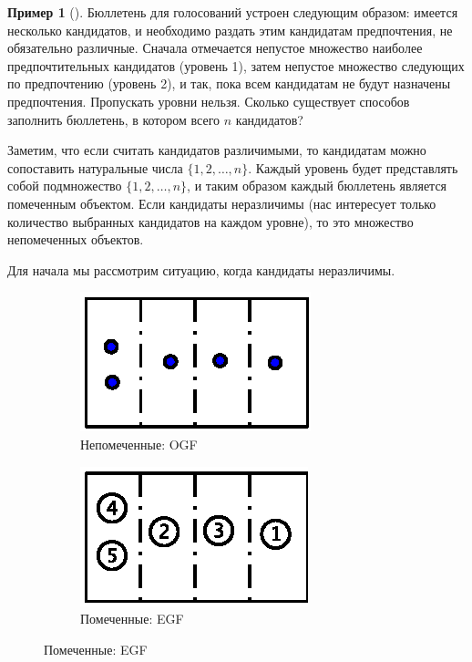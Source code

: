 \documentclass[a5paper]{article}
\theoremstyle{definition}
\newtheorem{example}{Пример}
\begin{document}
\begin{example}[{\cite[Example 10, p.36]{species}}]
Бюллетень для голосований устроен следующим образом: имеется несколько 
кандидатов, и необходимо раздать этим кандидатам предпочтения, не обязательно 
различные. Сначала отмечается 
непустое множество наиболее предпочтительных кандидатов (уровень 1), затем 
непустое множество следующих по предпочтению (уровень 2), и так, 
пока всем кандидатам не будут назначены предпочтения. Пропускать уровни нельзя. 
Сколько 
существует способов заполнить бюллетень, в котором всего \( n \) кандидатов? 

Заметим, что если считать кандидатов различимыми, то кандидатам можно 
сопоставить натуральные числа \( \{1, 2, \ldots, n\} \). Каждый уровень будет 
представлять собой подмножество \( \{1,2,\ldots, n\} \), и таким образом 
каждый бюллетень является помеченным объектом. Если кандидаты 
неразличимы (нас интересует только количество выбранных кандидатов на каждом 
уровне), то это множество непомеченных объектов.

Для начала мы рассмотрим ситуацию, когда кандидаты неразличимы. 

	\begin{figure}[h]
	\centering
    \begin{subfigure}{.5\textwidth}
    	\centering
		\includegraphics[width=.5\textwidth]{ballots_1.eps}
		\caption{Непомеченные: OGF}
		\label{fig:unrooted_trees}	
	\end{subfigure}%
    \begin{subfigure}{.5\textwidth}
		\centering
		\includegraphics[width=.5\textwidth]{ballots_2.eps}
		\caption{Помеченные: EGF}
		\label{fig:cycle_unrooted}	
	\end{subfigure}%
    \end{figure}



\end{example}
\end{document}

